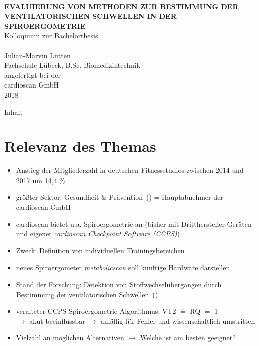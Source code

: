 \documentclass[colorBG,slideColor,8pt]{beamer}
\newcommand{\talktitle}{Evaluierung von Methoden zur Bestimmung der ventilatorischen Schwellen in der Spiroergometrie}
\begin{document}
\begin{frame}
    \vspace{-10ex}
    \textcolor{fhlred}{\HRuleFill[0.4ex]} \\ \vspace{1ex}
    {\linespread{1.5}\selectfont
    \MakeUppercase{\bf \huge \talktitle}\\[5.5ex]}
    \normalsize Kolloquium zur Bachelorthesis\\
    \textcolor{fhlred}{\HRuleFill[0.1ex]} \\ \vspace{4ex}
    \small Julian-Marvin Lütten\\
    \small Fachschule Lübeck, B.Sc. Biomedizintechnik\\
    \vspace{2ex}
    \small angefertigt bei der\\
    \small cardioscan GmbH\\
    \small 2018
\end{frame}

\begin{frame}{Inhalt}
\tableofcontents
\end{frame}


\section{Relevanz des Themas}

\begin{frame}
\begin{itemize}
	\item Anstieg der Mitgliederzahl in deutschen Fitnessstudios zwischen 2014 und 2017 um 14,4 \%
	\item größter Sektor: Gesundheit \& Prävention~(\cite{DSSV.2018}) = Hauptabnehmer der cardioscan GmbH
	\item cardioscan bietet u.a. Spiroergometrie an (bisher mit Dritthersteller-Geräten und eigener \textsl{cardioscan Checkpoint Software (CCPS)})
	\item Zweck: Definition von individuellen Trainingsbereichen
	\item neues Spiroergometer \textsl{metabolicscan} soll künftige Hardware darstellen
	\item Stand der Forschung: Detektion von Stoffwechselübergängen durch Bestimmung der ventilatorischen Schwellen~(\cite{Westhoff.2012})
	\item veralteter CCPS-Spiroergometrie-Algorithmus: VT2 $\hat{=}$  RQ $=$ 1\\$\rightarrow$ akut beeinflussbar $\rightarrow$ anfällig für Fehler und wissenschaftlich umstritten
	\item Vielzahl an möglichen Alternativen $\rightarrow$ Welche ist am besten geeignet?
\end{itemize}
\end{frame}
\end{document}
